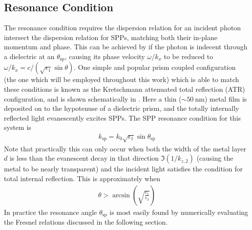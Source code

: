 \documentclass[a4paper,titlepage,onecolumn]{report}
\begin{document}
\subsection{Resonance Condition}
The resonance condition requires the dispersion relation for an
incident photon intersect the dispersion relation for SPPs, matching both
their in-plane momentum and phase.  This can be achieved by if the photon
is indecent through a dielectric at an $\theta_\text{sp}$, causing its phase
velocity $\omega/k_x$ to be reduced to  $\omega/k_x = c/(\sqrt{\epsilon_1}
\sin \theta)$.  One simple and popular prism coupled configuration (the one
which will be employed throughout this work) which is able to match these
conditions is known as the Kretschmann attenuated total reflection (ATR)
configuration, and is shown schematically in .
Here a thin ($\sim \SI{50}{\nano\meter}$) metal film is deposited on to the
hypotenuse of a dielectric prism, and the totally internally reflected
light evanescently excites SPPs.  The SPP resonance condition for this
system is
\begin{align}
k_\text{sp}=k_0 \sqrt{\epsilon_1} \sin \theta_\text{sp} 
\end{align}
Note that practically this can only occur when both the width of the metal
layer $d$ is less than the evanescent decay in that direction
$\Im(1/k_{z,2})$ (causing the metal to be nearly transparent) and the
incident light satisfies the condition for total internal reflection.  This 
is approximately when
\begin{align}
\theta>\arcsin\left(\sqrt{\frac{\epsilon_1}{\epsilon_3}}\right)
\end{align} 
In practice the resonance angle $\theta_\text{sp}$ is most easily found by
numerically evaluating the Fresnel relations discussed in the following
section.
\end{document}

